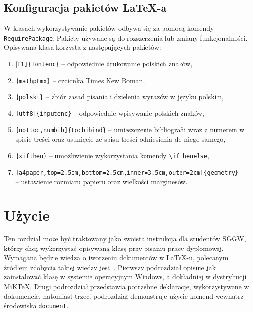 \documentclass{SGGW-thesis}
\begin{document}
\section{Konfiguracja pakietów \LaTeX-a}
\label{sec:konfiguracja-pakietow}
W klasach wykorzystywanie pakietów odbywa się za pomocą komendy \verb|RequirePackage|. Pakiety używane są do rozszerzenia lub zmiany funkcjonalności. Opisywana klasa korzysta
z następujących pakietów:
\begin{enumerate}[label=\alph*.,itemsep=0pt]
\item{[\verb|T1]{fontenc}| -- odpowiednie drukowanie polskich znaków,}
\item{\verb|{mathptmx}| -- czcionka Times New Roman,}
\item{\verb|{polski}| -- zbiór zasad pisania i dzielenia wyrazów w języku polskim,}
\item{\verb|[utf8]{inputenc}| -- odpowiednie wpisywanie polskich znaków,}
\item{\verb|[nottoc,numbib]{tocbibind}| -- umieszczenie bibliografii wraz z numerem w spisie treści oraz usunięcie ze spisu treści odniesienia do niego samego,}
\item{\verb|{xifthen}| -- umożliwienie wykorzystania komendy \verb|\ifthenelse|,}
\item{\verb|[a4paper,top=2.5cm,bottom=2.5cm,inner=3.5cm,outer=2cm]{geometry}|\\ -- ustawienie rozmiaru papieru oraz wielkości marginesów.}
\end{enumerate}


\chapter{Użycie}
Ten rozdział może być traktowany jako swoista instrukcja dla studentów SGGW, którzy chcą wykorzystać opisywaną klasę przy pisaniu pracy dyplomowej. Wymagana będzie wiedza o
tworzeniu dokumentów w \LaTeX-u, polecanym źródłem zdobycia takiej wiedzy jest~\cite{latexcompanion}. Pierwszy podrozdział opisuje jak zainstalować klasę w systemie
operacyjnym Windows, a dokładniej w dystrybucji MiK\TeX. Drugi podrozdział przedstawia  potrzebne deklaracje, wykorzystywane w dokumencie, natomiast trzeci podrozdział
demonstruje użycie komend wewnątrz środowiska \verb|document|.
\end{document}
